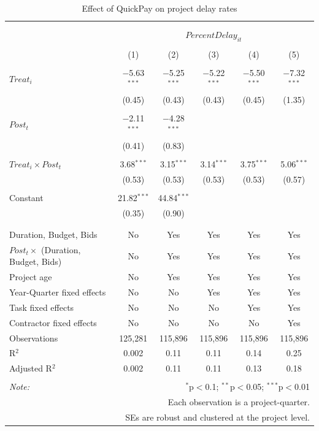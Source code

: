 \documentclass[
]{article}
\begin{document}
\begin{table}[H] \centering 
  \caption{Effect of QuickPay on project delay rates} 
  \label{} 
\small 
\begin{tabular}{@{\extracolsep{-2pt}}lccccc} 
\\[-1.8ex]\hline 
\hline \\[-1.8ex] 
\\[-1.8ex] & \multicolumn{5}{c}{$PercentDelay_{it}$} \\ 
\\[-1.8ex] & (1) & (2) & (3) & (4) & (5)\\ 
\hline \\[-1.8ex] 
 $Treat_i$ & $-$5.63$^{***}$ & $-$5.25$^{***}$ & $-$5.22$^{***}$ & $-$5.50$^{***}$ & $-$7.32$^{***}$ \\ 
  & (0.45) & (0.43) & (0.43) & (0.45) & (1.35) \\ 
  & & & & & \\ 
 $Post_t$ & $-$2.11$^{***}$ & $-$4.28$^{***}$ &  &  &  \\ 
  & (0.41) & (0.83) &  &  &  \\ 
  & & & & & \\ 
 $Treat_i \times Post_t$ & 3.68$^{***}$ & 3.15$^{***}$ & 3.14$^{***}$ & 3.75$^{***}$ & 5.06$^{***}$ \\ 
  & (0.53) & (0.53) & (0.53) & (0.53) & (0.57) \\ 
  & & & & & \\ 
 Constant & 21.82$^{***}$ & 44.84$^{***}$ &  &  &  \\ 
  & (0.35) & (0.90) &  &  &  \\ 
  & & & & & \\ 
\hline \\[-1.8ex] 
Duration, Budget, Bids & No & Yes & Yes & Yes & Yes \\ 
$Post_t \times$  (Duration, Budget, Bids) & No & Yes & Yes & Yes & Yes \\ 
Project age & No & Yes & Yes & Yes & Yes \\ 
Year-Quarter fixed effects & No & No & Yes & Yes & Yes \\ 
Task fixed effects & No & No & No & Yes & Yes \\ 
Contractor fixed effects & No & No & No & No & Yes \\ 
Observations & 125,281 & 115,896 & 115,896 & 115,896 & 115,896 \\ 
R$^{2}$ & 0.002 & 0.11 & 0.11 & 0.14 & 0.25 \\ 
Adjusted R$^{2}$ & 0.002 & 0.11 & 0.11 & 0.13 & 0.18 \\ 
\hline 
\hline \\[-1.8ex] 
\textit{Note:}  & \multicolumn{5}{r}{$^{*}$p$<$0.1; $^{**}$p$<$0.05; $^{***}$p$<$0.01} \\ 
 & \multicolumn{5}{r}{Each observation is a project-quarter.} \\ 
 & \multicolumn{5}{r}{SEs are robust and clustered at the project level.} \\ 
\end{tabular} 
\end{table}
\end{document}
